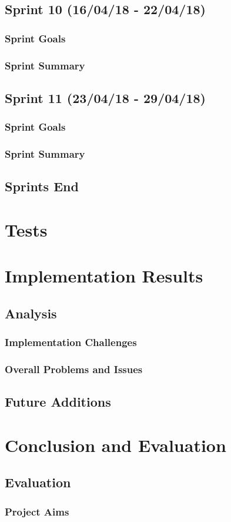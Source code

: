 \documentclass[a4paper,10pt]{report}
\begin{document}
\clearpage
\section{Sprint 10 (16/04/18 -  22/04/18)}

\subsection{Sprint Goals}

\subsection{Sprint Summary}

\clearpage
\section{Sprint 11 (23/04/18 -  29/04/18)}

\subsection{Sprint Goals}

\subsection{Sprint Summary}

\section{Sprints End}
\chapter{Tests}

\chapter{Implementation Results}
\section{Analysis}
\subsection{Implementation Challenges}
\subsection{Overall Problems and Issues}
\section{Future Additions}

\chapter{Conclusion and Evaluation}
\section{Evaluation}
\subsection{Project Aims}


\clearpage


\end{document}
